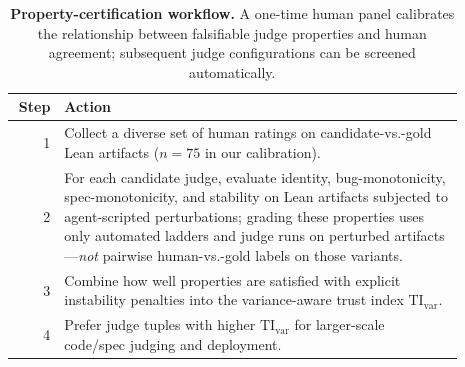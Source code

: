 \documentclass{article}
\begin{document}
\begin{table}[t]
  \centering
  \small
  \begin{tabular}{@{}r@{\kern 7pt}>{\raggedright\arraybackslash} p{0.89\linewidth}@{}}
    \toprule
    \textbf{Step} & \textbf{Action}                                                                                                                                                                                                                                                                                      \\
    \midrule
    1             &
    Collect a diverse set of human ratings on candidate-vs.-gold Lean artifacts (\(n{=}75\) in our calibration).                                                                                                                                                                                                         \\
    2             &
    For each candidate judge, evaluate identity, bug-monotonicity, spec-monotonicity, and stability on Lean artifacts subjected to agent-scripted perturbations; grading these properties uses only automated ladders and judge runs on perturbed artifacts—\emph{not} pairwise human-vs.-gold labels on those variants. \\
    3             &
    Combine how well properties are satisfied with explicit instability penalties into the variance-aware trust index \(\mathrm{TI}_{\mathrm{var}}\).                                                                                                                                                                    \\
    4             &
    Prefer judge tuples with higher \(\mathrm{TI}_{\mathrm{var}}\) for larger-scale code/spec judging and deployment.                                                                                                                                                                                                    \\
    \bottomrule
  \end{tabular}
  \caption{\textbf{Property-certification workflow.}
    A one-time human panel calibrates the relationship between falsifiable judge properties
    and human agreement; subsequent judge configurations can be screened automatically.}
  \label{tab:protocol_workflow}
\end{table}
\end{document}
